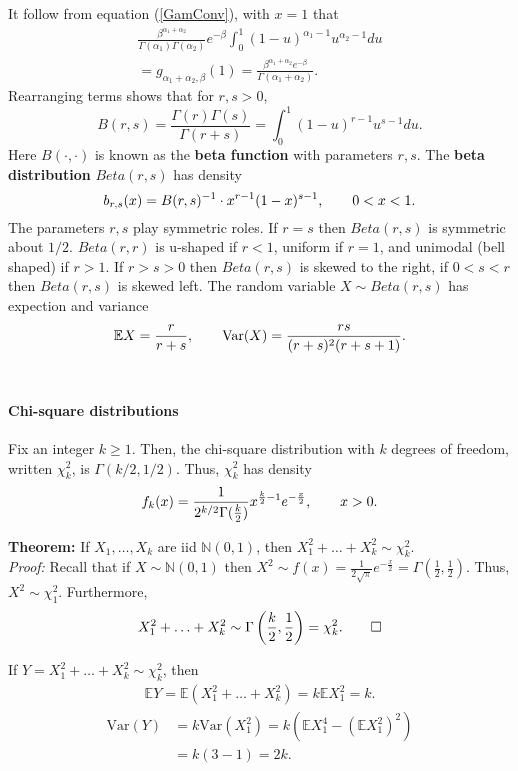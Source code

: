 \documentclass[12pt,oneside]{article}
\begin{document}
It follow from equation (\ref{GamConv}), with $x=1$ that
\begin{eqnarray*}
\frac{\beta^{\alpha_1+\alpha_2}}{\Gamma (\alpha_1) \Gamma (\alpha_2)} e^{-\beta} \int_0^1 (1-u)^{\alpha_1-1} u^{\alpha_2-1} du \\
= g_{\alpha_1+\alpha_2,\beta}(1) = \frac{\beta^{\alpha_1+\alpha_2}e^{-\beta}}{\Gamma (\alpha_1+\alpha_2)} .\end{eqnarray*}
Rearranging terms shows that for $r,s>0$,
\[B(r,s)=\frac{\Gamma (r) \Gamma(s)}{\Gamma(r+s)} = \int_0^1 (1-u)^{r-1} u^{s-1} du. \]
Here $B(\cdot,\cdot)$ is known as the \textbf{beta function} with parameters $r,s$.  The \textbf{beta distribution} $Beta(r,s)$ has density
\[b_{r,s}(x) = B(r,s)^{-1} \cdot x^{r-1}(1-x)^{s-1}, \hspace{20 pt} 0<x<1.\]
The parameters $r,s$ play symmetric roles.  If $r=s$ then $Beta (r,s)$ is symmetric about $1/2$.  $Beta(r,r)$ is u-shaped if $r < 1$, uniform if $r=1$, and unimodal (bell shaped) if $r>1$.  If $r>s>0$ then $Beta(r,s)$ is skewed to the right, if $0<s<r$ then $Beta(r,s)$ is skewed left.  The random variable $X \sim Beta(r,s)$ has expection and variance
\[\mathbb{E}X = \frac{r}{r+s}, \hspace{20 pt} \mbox{Var}(X) = \frac{rs}{(r+s)^2(r+s+1)}.\] \\

\paragraph{Chi-square distributions}
Fix an integer $k \geq 1$.  Then, the chi-square distribution with $k$ degrees of freedom, written $\chi^2_k$, is $\Gamma(k/2,1/2)$.  Thus, $\chi^2_k$ has density
\[f_k(x) = \frac{1}{2^{k/2} \Gamma(\frac{k}{2})} x^{\frac{k}{2}-1}e^{-\frac{x}{2}} , \hspace{20 pt} x>0.\]

\noindent \textbf{Theorem:} If $X_1,\hdots,X_k$ are iid $\mathbb{N}(0,1)$, then $X_1^2+\hdots+X_k^2 \sim \chi_k^2$.\\

\noindent\emph{Proof:}  Recall that if $X \sim \mathbb{N}(0,1)$ then $X^2 \sim f(x) = \frac{1}{2 \sqrt{\pi}} e^{-\frac{x}{2}} = \Gamma(\frac{1}{2},\frac{1}{2})$.  Thus, $X^2 \sim \chi_1^2$.  Furthermore,
\[X_1^2+\hdots+X_k^2 \sim \Gamma\left(\frac{k}{2},\frac{1}{2}\right) = \chi_k^2 . \hspace{20 pt} \Box \]

\noindent If $Y=X_1^2+\hdots+X_k^2 \sim \chi_k^2$, then
\begin{align}
\mathbb{E}Y= \mathbb{E}(X_1^2+\hdots+X_k^2) = k \mathbb{E}X_1^2 = k. \nonumber
\end{align}
\begin{align}
\mbox{Var}(Y) &= k \mbox{Var}(X_1^2) = k(\mathbb{E}X_1^4-(\mathbb{E}X_1^2)^2) \nonumber \\
&= k(3-1) = 2k \nonumber.
\end{align}
\end{document}
